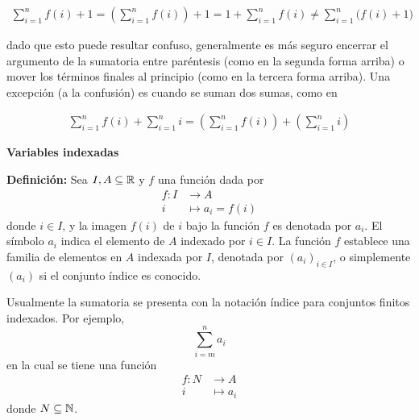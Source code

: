 \begin{align*}
  \sum_{i=1}^{n} f(i) + 1 = \left(\sum_{i=1}^{n}f(i)\right) + 1 = 1 + \sum_{i=1}^{n} f(i) \neq \sum_{i=1}^{n} \bigl(f(i)+1\bigr)
\end{align*}

dado que esto puede resultar confuso, generalmente es más seguro encerrar el argumento de la sumatoria entre paréntesis (como en la segunda forma arriba) o mover los términos finales al principio (como en la tercera forma arriba). Una excepción (a la confusión) es cuando se suman dos sumas, como en

\begin{align*}
  \sum_{i=1}^{n} f(i) + \sum_{i=1}^{n} i = \left(\sum_{i=1}^{n}f(i)\right) + \left(\sum_{i=1}^{n}i\right)
\end{align*}

\textbf{Variables indexadas}

\textbf{Definición:} Sea $I, A\subseteq \mathbb{R}$ y $f$ una función dada por
\begin{align*}
  f : I &\to A\\
  i &\mapsto a_i = f(i) 
\end{align*}
donde $i\in I$, y la imagen $f(i)$ de $i$ bajo la función $f$ es denotada por $a_i$. El símbolo $a_i$ indica el elemento de $A$ indexado por $i\in I$. La función $f$ establece una familia de elementos en $A$ indexada por $I$, denotada por $(a_i)_{i\in I}$, o simplemente $(a_i)$ si el conjunto índice es conocido.


Usualmente la sumatoria se presenta con la notación índice para conjuntos finitos indexados. Por ejemplo, \[\sum_{i=m}^{n} a_i\]
en la cual se tiene una función%
\begin{align*}
f : N &\to A\\
i &\mapsto a_i
\end{align*}
donde $N\subseteq \mathbb{N}$.

